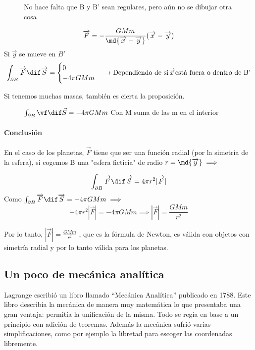 \begin{figure}[hbtp]
	\centering
	\caption{No hace falta que B y B' sean regulares, pero aún no se dibujar otra cosa}
\end{figure}
$$\overrightarrow F = - \frac{GMm}{\md{\overrightarrow x - \overrightarrow y}}(\overrightarrow x - \overrightarrow y)$$
 Si $\overrightarrow y $ se mueve en $B'$
 $$\int_{\partial B} \overrightarrow F \dif \overrightarrow S =
 \begin{cases}
 0\\
 -4\pi GMm\\
 \end{cases}
 \rightarrow \text{Dependiendo de si} \overrightarrow x \text{está fuera o dentro de B'}$$

 Si tenemos muchas masas, también es cierta la proposición.\\

\begin{figure}[hbtp]
	\centering
	\caption{$\int_{\partial B} \vf \dif \vec{S} = -4\pi GMm $ Con M suma de las m en el interior}
\end{figure}
\newpage
\paragraph{Conclusión}
En el caso de los planetas, $\overrightarrow F$ tiene que ser una función radial (por la simetría de la esfera), si cogemos B una "esfera ficticia" de radio $r = \md{\overrightarrow y} \implies$
\begin{figure}[hbtp]
	\centering
\end{figure}
$$\int_{\partial B} \overrightarrow F \dif \overrightarrow S = 4 \pi r^2 |\overrightarrow F|$$
Como $\int_{\partial B} \overrightarrow F \dif \overrightarrow S = -4\pi GMm  \implies$
$$ - 4\pi r^2 |\overrightarrow F| = -4\pi GMm \implies |\overrightarrow F| = \frac{GMm}{r^2}$$

Por lo tanto, $|\overrightarrow F| = \frac{GMm}{r^2}$ , que es la fórmula de Newton, es válida con objetos con simetría radial y por lo tanto válida para los planetas.\\


\subsection{Un poco de mecánica analítica}
Lagrange escribió un libro llamado ``Mecánica Analítica'' publicado en 1788. Este libro describía la mecánica de manera muy matemática lo que presentaba una gran ventaja: permitía la unificación de la misma. Todo se regía en base a un principio con adición de teoremas. Además la mecánica sufrió varias simplificaciones, como por ejemplo la libretad para escoger las coordenadas libremente.

